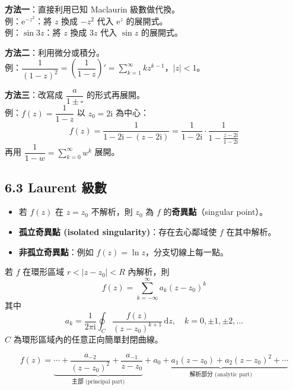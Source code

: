\documentclass[12pt,a4paper]{article}
\newcommand{\dd}{\,\mathrm{d}}
\newcommand{\ii}{\mathrm{i}}
\newcommand{\ee}{\mathrm{e}}
\begin{document}
\begin{exbox}
\textbf{方法一}：直接利用已知 Maclaurin 級數做代換。\\
例：$\ee^{-z^2}$：將 $z$ 換成 $-z^2$ 代入 $\ee^z$ 的展開式。\\
例：$\sin 3z$：將 $z$ 換成 $3z$ 代入 $\sin z$ 的展開式。

\textbf{方法二}：利用微分或積分。\\
例：$\dfrac{1}{(1-z)^2}=\left(\dfrac{1}{1-z}\right)'=\displaystyle\sum_{k=1}^{\infty}kz^{k-1}$，$|z|<1$。

\textbf{方法三}：改寫成 $\dfrac{a}{1\pm\square}$ 的形式再展開。\\
例：$f(z)=\dfrac{1}{1-z}$ 以 $z_0=2\ii$ 為中心：
$$f(z)=\frac{1}{1-2\ii-(z-2\ii)}=\frac{1}{1-2\ii}\cdot\frac{1}{1-\frac{z-2\ii}{1-2\ii}}$$
再用 $\dfrac{1}{1-w}=\displaystyle\sum_{k=0}^{\infty}w^k$ 展開。
\end{exbox}

\subsection{6.3 Laurent 級數}

\begin{defbox}
\begin{itemize}[nosep]
\item 若 $f(z)$ 在 $z=z_0$ 不解析，則 $z_0$ 為 $f$ 的\textbf{奇異點}（singular point）。
\item \textbf{孤立奇異點 (isolated singularity)}：存在去心鄰域使 $f$ 在其中解析。
\item \textbf{非孤立奇異點}：例如 $f(z)=\ln z$，分支切線上每一點。
\end{itemize}
\end{defbox}

\begin{theorembox}
若 $f$ 在環形區域 $r<|z-z_0|<R$ 內解析，則
$$f(z)=\sum_{k=-\infty}^{\infty}a_k(z-z_0)^k$$
其中
$$a_k=\frac{1}{2\pi\ii}\oint_C\frac{f(z)}{(z-z_0)^{k+1}}\dd{z},\quad k=0,\pm1,\pm2,\dots$$
$C$ 為環形區域內的任意正向簡單封閉曲線。
\end{theorembox}

\begin{keybox}
$$f(z)=\underbrace{\cdots+\frac{a_{-2}}{(z-z_0)^2}+\frac{a_{-1}}{z-z_0}}_{\text{主部 (principal part)}}+\underbrace{a_0+a_1(z-z_0)+a_2(z-z_0)^2+\cdots}_{\text{解析部分 (analytic part)}}$$
\end{keybox}
\end{document}
